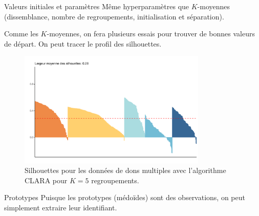 \documentclass[
  ignorenonframetext,
]{beamer}
\newenvironment{Shaded}{\begin{snugshade}}{\end{snugshade}}
\newcommand{\CommentTok}[1]{\textcolor[rgb]{0.37,0.37,0.37}{#1}}
\newcommand{\NormalTok}[1]{\textcolor[rgb]{0.00,0.23,0.31}{#1}}
\newcommand{\OtherTok}[1]{\textcolor[rgb]{0.00,0.23,0.31}{#1}}
\newcommand{\SpecialCharTok}[1]{\textcolor[rgb]{0.37,0.37,0.37}{#1}}
\begin{document}
\begin{frame}{Valeurs initiales et paramètres}
\protect\hypertarget{valeurs-initiales-et-paramuxe8tres}{}
Même hyperparamètres que \(K\)-moyennes (dissemblance, nombre de
regroupements, initialisation et séparation).

Comme les \(K\)-moyennes, on fera plusieurs essais pour trouver de
bonnes valeurs de départ. On peut tracer le profil des silhouettes.

\begin{figure}

{\centering \includegraphics[width=0.8\textwidth,height=\textheight]{MATH60602-diapos12_files/figure-beamer/fig-clarasilhouette-1.pdf}

}

\caption{\label{fig-clarasilhouette}Silhouettes pour les données de dons
multiples avec l'algorithme CLARA pour \(K=5\) regroupements.}

\end{figure}
\end{frame}

\begin{frame}[fragile]{Prototypes}
\protect\hypertarget{prototypes}{}
Puisque les prototypes (médoïdes) sont des observations, on peut
simplement extraire leur identifiant.

\begin{Shaded}
\end{Shaded}
\end{frame}
\end{document}
